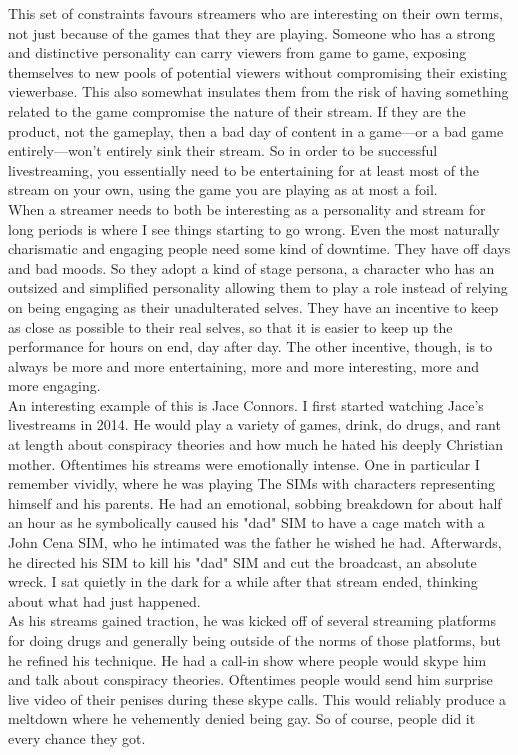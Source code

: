 \documentclass{article}
\begin{document}
This set of constraints favours streamers who are interesting on their own terms, not just because of the games that they are playing. Someone who has a strong and distinctive personality can carry viewers from game to game, exposing themselves to new pools of potential viewers without compromising their existing viewerbase. This also somewhat insulates them from the risk of having something related to the game compromise the nature of their stream. If they are the product, not the gameplay, then a bad day of content in a game---or a bad game entirely---won't entirely sink their stream. So in order to be successful livestreaming, you essentially need to be entertaining for at least most of the stream on your own, using the game you are playing as at most a foil.\\

When a streamer needs to both be interesting as a personality and stream for long periods is where I see things starting to go wrong. Even the most naturally charismatic and engaging people need some kind of downtime. They have off days and bad moods. So they adopt a kind of stage persona, a character who has an outsized and simplified personality allowing them to play a role instead of relying on being engaging as their unadulterated selves. They have an incentive to keep as close as possible to their real selves, so that it is easier to keep up the performance for hours on end, day after day. The other incentive, though, is to always be more and more entertaining, more and more interesting, more and more engaging.\\

An interesting example of this is Jace Connors. I first started watching Jace's livestreams in 2014. He would play a variety of games, drink, do drugs, and rant at length about conspiracy theories and how much he hated his deeply Christian mother. Oftentimes his streams were emotionally intense. One in particular I remember vividly, where he was playing The SIMs with characters representing himself and his parents. He had an emotional, sobbing breakdown for about half an hour as he symbolically caused his "dad" SIM to have a cage match with a John Cena SIM, who he intimated was the father he wished he had. Afterwards, he directed his SIM to kill his "dad" SIM and cut the broadcast, an absolute wreck. I sat quietly in the dark for a while after that stream ended, thinking about what had just happened.\\

As his streams gained traction, he was kicked off of several streaming platforms for doing drugs and generally being outside of the norms of those platforms, but he refined his technique. He had a call-in show where people would skype him and talk about conspiracy theories. Oftentimes people would send him surprise live video of their penises during these skype calls. This would reliably produce a meltdown where he vehemently denied being gay. So of course, people did it every chance they got.\\
\end{document}
